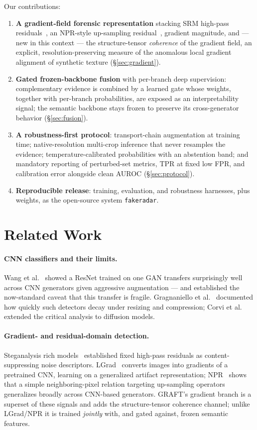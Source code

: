 \documentclass[10pt,twocolumn]{article}
\begin{document}
Our contributions:
\begin{enumerate}\itemsep2pt
  \item \textbf{A gradient-field forensic representation} stacking SRM
  high-pass residuals~\cite{fridrich2012rich}, an NPR-style up-sampling
  residual~\cite{tan2024npr}, gradient magnitude, and --- new in this context
  --- the structure-tensor \emph{coherence} of the gradient field, an
  explicit, resolution-preserving measure of the anomalous local gradient
  alignment of synthetic texture (\S\ref{sec:gradient}).
  \item \textbf{Gated frozen-backbone fusion} with per-branch deep
  supervision: complementary evidence is combined by a learned gate whose
  weights, together with per-branch probabilities, are exposed as an
  interpretability signal; the semantic backbone stays frozen to preserve its
  cross-generator behavior (\S\ref{sec:fusion}).
  \item \textbf{A robustness-first protocol}: transport-chain augmentation at
  training time; native-resolution multi-crop inference that never resamples
  the evidence; temperature-calibrated probabilities with an abstention band;
  and mandatory reporting of perturbed-set metrics, TPR at fixed low FPR, and
  calibration error alongside clean AUROC (\S\ref{sec:protocol}).
  \item \textbf{Reproducible release}: training, evaluation, and robustness
  harnesses, plus weights, as the open-source system \texttt{fakeradar}.
\end{enumerate}

\section{Related Work}
\paragraph{CNN classifiers and their limits.}
Wang et al.~\cite{wang2020cnn} showed a ResNet trained on one GAN transfers
surprisingly well across CNN generators given aggressive augmentation --- and
established the now-standard caveat that this transfer is fragile.
Gragnaniello et al.~\cite{gragnaniello2021gan} documented how quickly such
detectors decay under resizing and compression; Corvi et
al.~\cite{corvi2023detection} extended the critical analysis to diffusion
models.

\paragraph{Gradient- and residual-domain detection.}
Steganalysis rich models~\cite{fridrich2012rich} established fixed high-pass
residuals as content-suppressing noise descriptors. LGrad~\cite{tan2023lgrad}
converts images into gradients of a pretrained CNN, learning on a
generalized artifact representation; NPR~\cite{tan2024npr} shows that a
simple neighboring-pixel relation targeting up-sampling operators
generalizes broadly across CNN-based generators. GRAFT's gradient branch is
a superset of these signals and adds the structure-tensor coherence channel;
unlike LGrad/NPR it is trained \emph{jointly} with, and gated against,
frozen semantic features.
\end{document}
